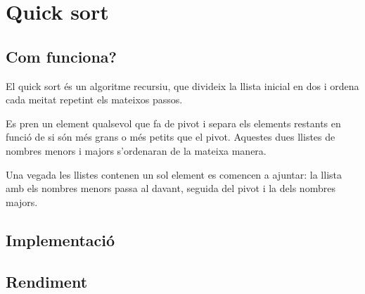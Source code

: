 \chapter{Quick sort}

\section{Com funciona?}
El quick sort és un algoritme recursiu, que divideix la llista inicial en dos i ordena cada meitat repetint els mateixos passos.

Es pren un element qualsevol que fa de pivot i separa els elements restants en funció de si són més grans o més petits que el pivot. Aquestes dues llistes de nombres menors i majors s'ordenaran de la mateixa manera.

Una vegada les llistes contenen un sol element es comencen a ajuntar: la llista amb els nombres menors passa al davant, seguida del pivot i la dels nombres majors.
\section{Implementació}


\begin{minipage}{\textwidth}
	\section{Rendiment}
	\noindent
	\makebox[\textwidth][c]{
		
		}
	\vspace*{1em}
	\begin{center}
		\resizebox{\textwidth}{!}{}
	\end{center}
\end{minipage}